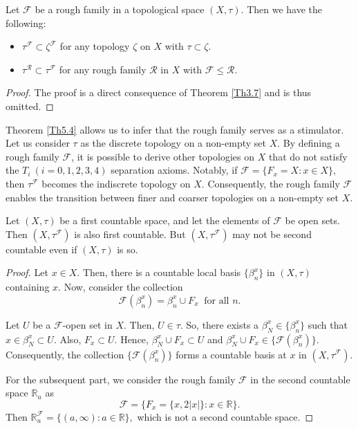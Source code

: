 \documentclass[11pt]{amsart}
\begin{document}
\begin{theorem}\label{Th5.4} Let $\mathscr{F}$ be a rough family in a topological space $(X,\tau)$. Then we have the following: \begin{itemize}
    \item[(i)] $\tau^\mathscr{F} \subset \zeta^{\mathscr{F}}$ for any topology $\zeta$ on $X$ with $\tau \subset \zeta$.
    
    \item[(ii)] $\tau^\mathscr{R} \subset \tau^{\mathscr{F}}$ for any rough family $\mathscr{R}$ in $X$ with $\mathscr{F}\leq \mathscr{R}$.
\end{itemize}
\end{theorem}

\begin{proof}
    The proof is a direct consequence of Theorem \ref{Th3.7} and is thus omitted.
\end{proof}

Theorem \ref{Th5.4} allows us to infer that the rough family serves as a stimulator. Let us consider $\tau$ as the discrete topology on a non-empty set $X$. By defining a rough family $\mathscr{F}$, it is possible to derive other topologies on $X$ that do not satisfy the $T_i~(i=0,1,2,3,4)$ separation axioms. Notably, if $\mathscr{F}=\{F_x=X: x\in X\}$, then $\tau^\mathscr{F}$ becomes the indiscrete topology on $X$. Consequently, the rough family $\mathscr{F}$ enables the transition between finer and coarser topologies on a non-empty set $X$.



 \begin{theorem}\label{L1}
      Let $(X,\tau)$ be a first countable space, and let the elements of $\mathscr{F}$ be open sets. Then $(X,\tau^\mathscr{F})$ is also first countable. But $(X,\tau^\mathscr{F})$ may not be second countable even if $(X,\tau)$ is so.
 \end{theorem}

  \begin{proof}
      Let $x\in X.$ Then, there is a countable local basis $\{\beta^x_n\}$ in $(X,\tau)$ containing $x$. Now, consider the collection $$\mathscr{F}(\beta^x_n)=\beta^x_n\cup F_x\ \text{ for all }n.$$
      
      Let $U$ be a $\mathscr{F}$-open set in $X$. Then, $U\in \tau$. So, there exists a $\beta_N^x\in \{\beta^x_n\}$ such that $x\in \beta^x_N\subset U$. Also, $F_x\subset U$. Hence, $\beta^x_N\cup F_x\subset U$ and $\beta^x_N\cup F_x\in \{\mathscr{F}(\beta^x_n)\}$.
      Consequently, the collection $\{\mathscr{F}(\beta^x_n)\}$ forms a countable basis at $x$ in $(X,\tau^\mathscr{F})$.

      For the subsequent part, we consider the rough family $\mathscr{F}$ in the second countable space $\mathbb{R}_u$ as $$\mathscr{F}=\{F_x=\{x,2|x|\}: x\in \mathbb{R}\}.$$
      Then $\mathbb{R}^\mathscr{F}_u=\{(a,\infty):  a\in \mathbb{R}\},$ which is not a second countable space.
  \end{proof}
\end{document}
